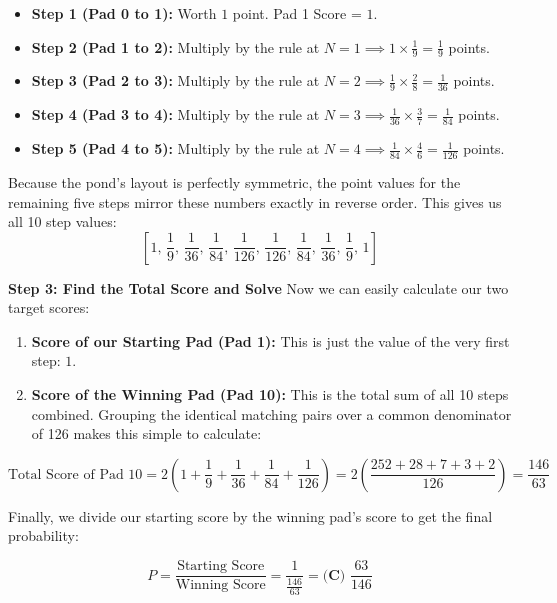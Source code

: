 \begin{enumerate}
 
            \begin{itemize}
        \item \textbf{Step 1 (Pad 0 to 1):} Worth $1$ point. Pad 1 Score = $1$.
        \item \textbf{Step 2 (Pad 1 to 2):} Multiply by the rule at $N=1 \implies 1 \times \frac{1}{9} = \frac{1}{9}$ points.
        \item \textbf{Step 3 (Pad 2 to 3):} Multiply by the rule at $N=2 \implies \frac{1}{9} \times \frac{2}{8} = \frac{1}{36}$ points.
        \item \textbf{Step 4 (Pad 3 to 4):} Multiply by the rule at $N=3 \implies \frac{1}{36} \times \frac{3}{7} = \frac{1}{84}$ points.
        \item \textbf{Step 5 (Pad 4 to 5):} Multiply by the rule at $N=4 \implies \frac{1}{84} \times \frac{4}{6} = \frac{1}{126}$ points.
            \end{itemize}
            Because the pond's layout is perfectly symmetric, the point values for the remaining five steps mirror these numbers exactly in reverse order. This gives us all 10 step values:
 \[\left[ 1, \, \frac{1}{9}, \, \frac{1}{36}, \, \frac{1}{84}, \, \frac{1}{126}, \, \frac{1}{126}, \, \frac{1}{84}, \, \frac{1}{36}, \, \frac{1}{9}, \, 1 \right]\]

 \textbf{Step 3: Find the Total Score and Solve} Now we can easily calculate our two target scores:

 
            \begin{enumerate}
        \item \textbf{Score of our Starting Pad (Pad 1):} This is just the value of the very first step: $1$.
        \item \textbf{Score of the Winning Pad (Pad 10):} This is the total sum of all 10 steps combined. Grouping the identical matching pairs over a common denominator of 126 makes this simple to calculate:
            \end{enumerate}
            
 \[\text{Total Score of Pad 10} = 2 \left(1 + \frac{1}{9} + \frac{1}{36} + \frac{1}{84} + \frac{1}{126}\right) = 2 \left(\frac{252 + 28 + 7 + 3 + 2}{126}\right) = \frac{146}{63}\]

 Finally, we divide our starting score by the winning pad's score to get the final probability:

 
 \[P = \frac{\text{Starting Score}}{\text{Winning Score}} = \frac{1}{\frac{146}{63}} = \boxed{\textbf{(C) } \frac{63}{146}}\]


\end{enumerate}
